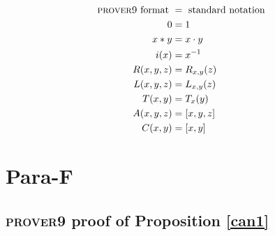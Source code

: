 \documentclass[12pt]{report}
\theoremstyle{definition}
\begin{document}
\begin{align*}
  \text{\textsc{prover9} format } &= \text{ standard notation}\\
  0 &= 1\\
  x * y &= x\cdot y\\
  i(x) &= x^{-1}\\
  R(x, y, z) &= R_{x, y}(z)\\
  L(x, y, z) &= L_{x, y}(z)\\
  T(x, y) &= T_x(y)\\
  A(x, y, z) &= [x, y, z]\\
  C(x, y) &= [x, y]
\end{align*}

\section{Para-F}

\subsection{\textsc{prover9} proof of Proposition \ref{can1}}
\end{document}
